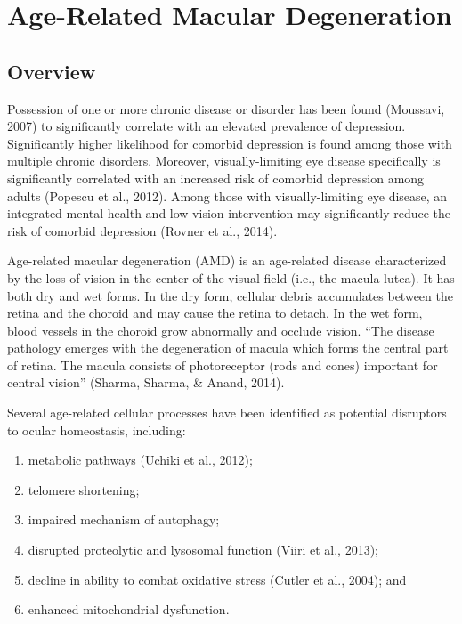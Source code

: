 
\section{Age-Related Macular Degeneration}

\subsection{Overview}

Possession of one or more chronic disease or disorder has been found (Moussavi, 2007) to significantly correlate with an elevated prevalence of depression. Significantly higher likelihood for comorbid depression is found among those with multiple chronic disorders. Moreover, visually-limiting eye disease specifically is significantly correlated with an increased risk of comorbid depression among adults (Popescu et al., 2012). Among those with visually-limiting eye disease, an integrated mental health and low vision intervention may significantly reduce the risk of comorbid depression (Rovner et al., 2014).

Age-related macular degeneration (AMD) is an age-related disease characterized by the loss of vision in the center of the visual field (i.e., the macula lutea). It has both dry and wet forms. In the dry form, cellular debris accumulates between the retina and the choroid and may cause the retina to detach. In the wet form, blood vessels in the choroid grow abnormally and occlude vision. ``The disease pathology emerges with the degeneration of macula which forms the central part of retina. The macula consists of photoreceptor (rods and cones) important for central vision'' (Sharma, Sharma, \& Anand, 2014).

Several age-related cellular processes have been identified as potential disruptors to ocular homeostasis, including:

\begin{enumerate}
	\item metabolic pathways (Uchiki et al., 2012);
	\item telomere shortening;
	\item impaired mechanism of autophagy;
	\item disrupted proteolytic and lysosomal function (Viiri et al., 2013);
	\item decline in ability to combat oxidative stress (Cutler et al., 2004); and
	\item enhanced mitochondrial dysfunction.
\end{enumerate}


